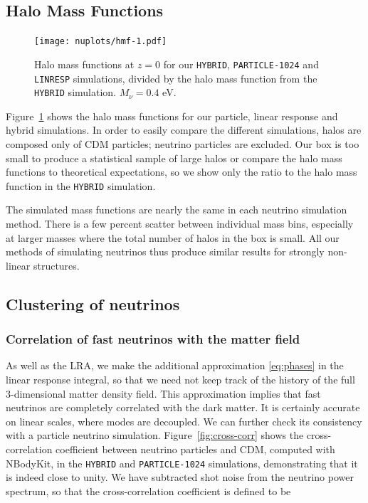 \documentclass[useAMS, usenatbib]{mnras}
\begin{document}
\subsection{Halo Mass Functions}
\label{sec:halomass}

\begin{figure}
  \texttt{[image: nuplots/hmf-1.pdf]}
\caption{Halo mass functions at $z=0$ for our \texttt{HYBRID}, \texttt{PARTICLE-1024} and \texttt{LINRESP} simulations, divided by the halo mass function from the \texttt{HYBRID} simulation. $M_\nu = 0.4$ eV.}
  \label{fig:halomass}
\end{figure}

Figure~\ref{fig:halomass} shows the halo mass functions for our particle, linear response and hybrid simulations. In order to easily compare the different simulations, halos are composed only of CDM particles; neutrino particles are excluded. Our box is too small to produce a statistical sample of large halos or compare the halo mass functions to theoretical expectations, so we show only the ratio to the halo mass function in the \texttt{HYBRID} simulation.

The simulated mass functions are nearly the same in each neutrino simulation method.
There is a few percent scatter between individual mass bins, especially at larger masses where the total number of halos in the box is small. All our methods of simulating neutrinos thus produce similar results for strongly non-linear structures.

\subsection{Clustering of neutrinos}
\label{sec:nupower}

\subsubsection{Correlation of fast neutrinos with the matter field}

As well as the LRA, we make the additional approximation \eqref{eq:phases} in the linear response integral, so that we need not keep track of the history of the full 3-dimensional matter density field. This approximation implies that fast neutrinos are completely correlated with the dark matter. It is certainly accurate on linear scales, where modes are decoupled. We can further check its consistency with a particle neutrino simulation. Figure~\ref{fig:cross-corr} shows the cross-correlation coefficient between neutrino particles and CDM, computed with NBodyKit, in the \texttt{HYBRID} and \texttt{PARTICLE-1024} simulations, demonstrating that it is indeed close to unity. We have subtracted shot noise from the neutrino power spectrum, so that the cross-correlation coefficient is defined to be
\end{document}
